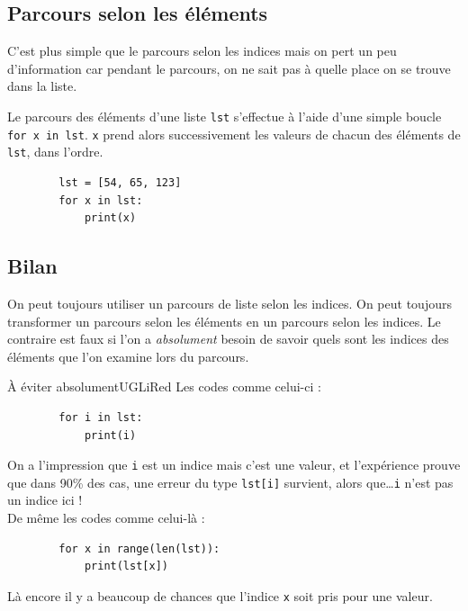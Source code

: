 \subsection{Parcours selon les éléments}

C'est plus simple que le parcours selon les indices mais on pert un peu d'information car pendant le parcours, on ne sait pas à quelle place on se trouve dans la liste.

\begin{definition}
	Le parcours des éléments d'une liste \texttt{lst} s'effectue à l'aide d'une simple boucle \texttt{for x in lst}. \texttt{x} prend alors successivement les valeurs de chacun des éléments de \texttt{lst}, dans l'ordre.
\end{definition}
\begin{exemple}
	\begin{verbatim}
		lst = [54, 65, 123]
		for x in lst:
			print(x)
		\end{verbatim}
\end{exemple}

\subsection{Bilan}

On peut toujours utiliser un parcours de liste selon les indices.
On peut toujours transformer un parcours selon les éléments en un parcours selon les indices.
Le contraire est faux si l'on a \textit{absolument} besoin de savoir quels sont les indices des éléments que l'on examine lors du parcours.

\begin{encadrecolore}{À éviter absolument}{UGLiRed}
	Les codes comme celui-ci :
	\begin{verbatim}
		for i in lst:
			print(i)
	\end{verbatim}
	On a l'impression que \texttt{i} est un indice mais c'est une valeur, et l'expérience prouve que dans 90\% des cas, une erreur du type \texttt{lst[i]} survient, alors que\ldots \texttt{i} n'est pas un indice ici !\\

	De même les codes comme celui-là :
	\begin{verbatim}
		for x in range(len(lst)):
			print(lst[x])
	\end{verbatim}
	Là encore il y a beaucoup de chances que l'indice \texttt{x} soit pris pour une valeur.
\end{encadrecolore}

